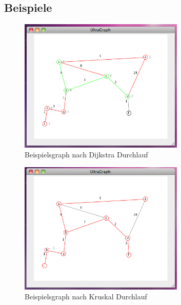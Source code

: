 \documentclass[a4paper,titlepage]{article}
\begin{document}
\newpage

\subsection{Beispiele}

\begin{figure}[h!]
\begin{center}
\includegraphics[width=0.7\textwidth]{screenshot/example.png}
\end{center}
\caption{Beispielsgraph nach Dijkstra Durchlauf}
\end{figure}

\begin{figure}[h!]
\begin{center}
\includegraphics[width=0.7\textwidth]{screenshot/example2.png}
\end{center}
\caption{Beispielsgraph nach Kruskal Durchlauf}
\end{figure}

\newpage
\end{document}
